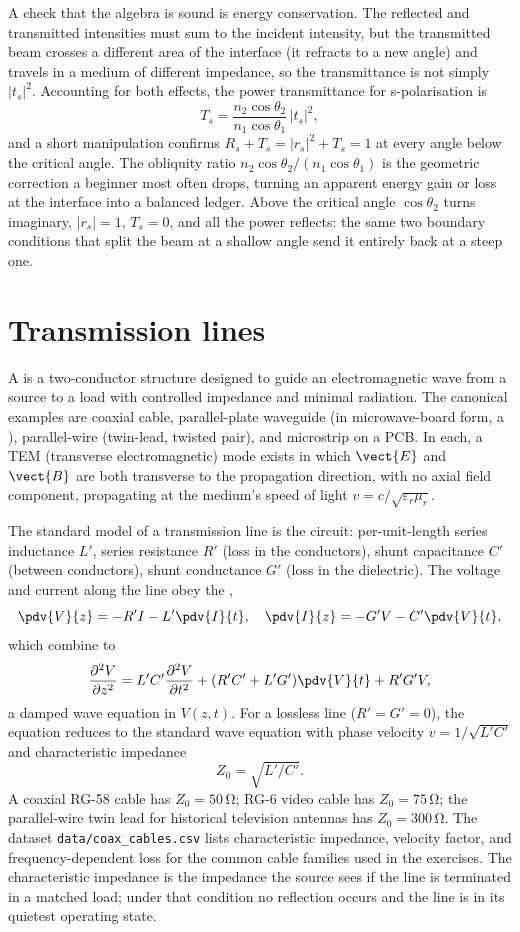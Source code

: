 A check that the algebra is sound is energy conservation. The reflected
and transmitted intensities must sum to the incident intensity, but the
transmitted beam crosses a different area of the interface (it refracts
to a new angle) and travels in a medium of different impedance, so the
transmittance is not simply $|t_s|^2$. Accounting for both effects, the
power transmittance for s-polarisation is
\[
T_s = \frac{n_2\cos\theta_2}{n_1\cos\theta_1}\,|t_s|^2,
\]
and a short manipulation confirms $R_s + T_s = |r_s|^2 + T_s = 1$ at
every angle below the critical angle. The obliquity ratio $n_2\cos
\theta_2/(n_1\cos\theta_1)$ is the geometric correction a beginner most
often drops, turning an apparent energy gain or loss at the interface
into a balanced ledger. Above the critical angle $\cos\theta_2$ turns
imaginary, $|r_s| = 1$, $T_s = 0$, and all the power reflects: the same
two boundary conditions that split the beam at a shallow angle send it
entirely back at a steep one.

\section{Transmission lines}

A  is a two-conductor structure designed to
guide an electromagnetic wave from a source to a load with controlled
impedance and minimal radiation. The canonical examples are coaxial
cable, parallel-plate waveguide (in microwave-board form, a
), parallel-wire (twin-lead, twisted pair), and
microstrip on a PCB. In each, a TEM (transverse electromagnetic) mode
exists in which $\vect{E}$ and $\vect{B}$ are both transverse to the
propagation direction, with no axial field component, propagating at
the medium's speed of light $v = c/\sqrt{\varepsilon_{r}\mu_{r}}$.

The standard model of a transmission line is the
 circuit: per-unit-length series
inductance $L'$, series resistance $R'$ (loss in the conductors),
shunt capacitance $C'$ (between conductors), shunt conductance $G'$
(loss in the dielectric). The voltage and current along the line obey
the ,
\[
\pdv{V}{z} = -R' I - L'\pdv{I}{t}, \quad \pdv{I}{z} = -G' V - C'
\pdv{V}{t},
\]
which combine to
\[
\frac{\partial^{2} V}{\partial z^{2}} = L'C'\frac{\partial^{2} V}{
\partial t^{2}} + (R'C'+L'G')\pdv{V}{t} + R'G' V,
\]
a damped wave equation in $V(z,t)$. For a lossless line ($R' = G' =
0$), the equation reduces to the standard wave equation with phase
velocity $v = 1/\sqrt{L'C'}$ and characteristic impedance
\[
Z_{0} = \sqrt{L'/C'}.
\]
A coaxial RG-58 cable has $Z_{0} = 50\,\si{\ohm}$; RG-6 video cable
has $Z_{0} = 75\,\si{\ohm}$; the parallel-wire twin lead for
historical television antennas has $Z_{0} = 300\,\si{\ohm}$. The
dataset \texttt{data/coax\_cables.csv} lists characteristic impedance,
velocity factor, and frequency-dependent loss for the common cable
families used in the exercises. The
characteristic impedance is the impedance the source sees if the line
is terminated in a matched load; under that condition no reflection
occurs and the line is in its quietest operating state.


